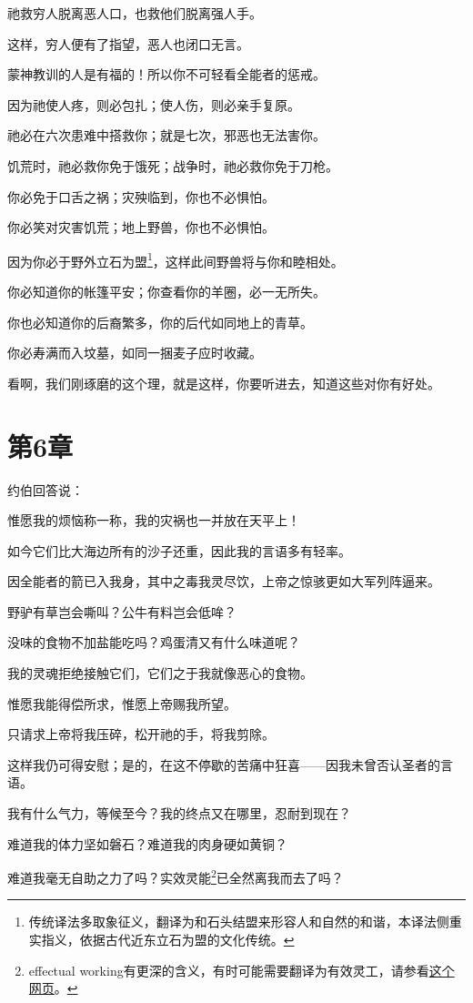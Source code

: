 \documentclass[12pt,oneside]{book}
\begin{document}
祂救穷人脱离恶人口，也救他们脱离强人手。

这样，穷人便有了指望，恶人也闭口无言。

蒙神教训的人是有福的！所以你不可轻看全能者的惩戒。

因为祂使人疼，则必包扎；使人伤，则必亲手复原。

祂必在六次患难中搭救你；就是七次，邪恶也无法害你。

饥荒时，祂必救你免于饿死；战争时，祂必救你免于刀枪。

你必免于口舌之祸；灾殃临到，你也不必惧怕。

你必笑对灾害饥荒；地上野兽，你也不必惧怕。

因为你必于野外立石为盟\footnote{传统译法多取象征义，翻译为和石头结盟来形容人和自然的和谐，本译法侧重实指义，依据古代近东立石为盟的文化传统。}，这样此间野兽将与你和睦相处。

你必知道你的帐篷平安；你查看你的羊圈，必一无所失。

你也必知道你的后裔繁多，你的后代如同地上的青草。

你必寿满而入坟墓，如同一捆麦子应时收藏。

看啊，我们刚琢磨的这个理，就是这样，你要听进去，知道这些对你有好处。


\chapter{第6章}
约伯回答说：

惟愿我的烦恼称一称，我的灾祸也一并放在天平上！

如今它们比大海边所有的沙子还重，因此我的言语多有轻率。

因全能者的箭已入我身，其中之毒我灵尽饮，上帝之惊骇更如大军列阵逼来。

野驴有草岂会嘶叫？公牛有料岂会低哞？

没味的食物不加盐能吃吗？鸡蛋清又有什么味道呢？

我的灵魂拒绝接触它们，它们之于我就像恶心的食物。

惟愿我能得偿所求，惟愿上帝赐我所望。

只请求上帝将我压碎，松开祂的手，将我剪除。

这样我仍可得安慰；是的，在这不停歇的苦痛中狂喜——因我未曾否认圣者的言语。

我有什么气力，等候至今？我的终点又在哪里，忍耐到现在？

难道我的体力坚如磐石？难道我的肉身硬如黄铜？

难道我毫无自助之力了吗？实效灵能\footnote{effectual working有更深的含义，有时可能需要翻译为有效灵工，请参看\href{https://www.my3bc.com/effectual-working-eph-415-16/}{这个网页}。}已全然离我而去了吗？
\end{document}

